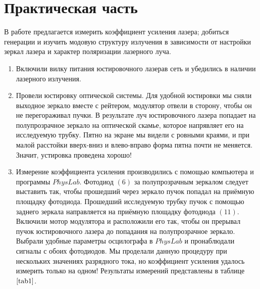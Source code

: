 \documentclass[a4paper,12pt]{article} %
\begin{document}
\newpage

\section{Практическая часть}

В работе предлагается измерить коэффициент усиления лазера; добиться генерации и изучить модовую структуру излучения в зависимости от настройки зеркал лазера и характер поляризации лазерного луча.

\begin{enumerate}
    \item Включили вилку питания юстировочного лазерав сеть и убедились в наличии лазерного излучения.
    \item Провели юстировку оптической системы. Для удобной юстировки мы сняли выходное зеркало вместе с рейтером, модулятор отвели в сторону, чтобы он не перегораживал пучки. В результате луч юстировочного лазера попадает на полупрозрачное зеркало на оптической скамье, которое напрявляет его на исследуемую трубку. Пятно на экране мы видели с ровными краями, и при малой расстойки вверх-вниз и влево-вправо форма пятна почти не меняется. Значит, устировка проведена хорошо!
    \item Измерение коэффициента усиления производились с помощью компьютера и программы $PhysLab$.
    Фотодиод $(6)$ за полупрозрачным зеркалом следует выставить так, чтобы прошедший через зеркало пучок попадал на приёмную площадку фотодиода. Прошедший исследуемую трубку пучок с помощью заднего зеркала направляется на приёмную площадку фотодиода $(11)$. Включили мотор модулятора и расположили его так, чтобы он прерывал пучок юстировочного лазера до попадания на полупрозрачное зеркало. Выбрали удобные параметры осцилографа в $PhysLab$ и пронаблюдали сигналы с обоих фотодиодов. Мы проделали данную процедуру при нескольких значениях разрядного тока, но коэффициент усиления удалось измерить только на одном! Результаты измерений представлены в таблице $\ref{tab1}$.


\end{enumerate}
\end{document}
